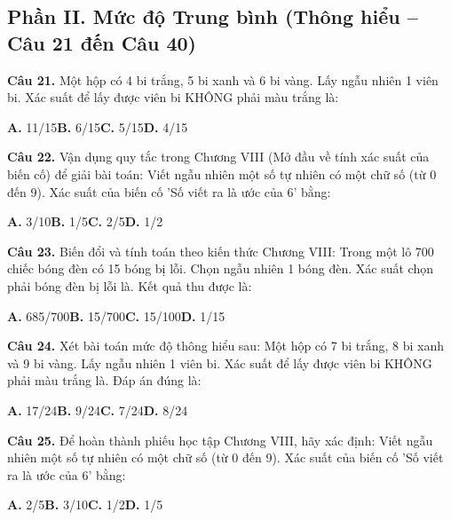 \documentclass[11pt,a4paper]{article}
\begin{document}
\subsection*{\color{accent} Phần II. Mức độ Trung bình (Thông hiểu -- Câu 21 đến Câu 40)}
\textbf{\color{primary} Câu 21.} Một hộp có 4 bi trắng, 5 bi xanh và 6 bi vàng. Lấy ngẫu nhiên 1 viên bi. Xác suất để lấy được viên bi KHÔNG phải màu trắng là:\par
\hspace*{1.5em}\textbf{A.} 11/15\quad\quad \textbf{B.} 6/15\quad\quad \textbf{C.} 5/15\quad\quad \textbf{D.} 4/15\par\vspace{2pt}
\textbf{\color{primary} Câu 22.} Vận dụng quy tắc trong Chương VIII (Mở đầu về tính xác suất của biến cố) để giải bài toán: Viết ngẫu nhiên một số tự nhiên có một chữ số (từ 0 đến 9). Xác suất của biến cố 'Số viết ra là ước của 6' bằng:\par
\hspace*{1.5em}\textbf{A.} 3/10\quad\quad \textbf{B.} 1/5\quad\quad \textbf{C.} 2/5\quad\quad \textbf{D.} 1/2\par\vspace{2pt}
\textbf{\color{primary} Câu 23.} Biến đổi và tính toán theo kiến thức Chương VIII: Trong một lô 700 chiếc bóng đèn có 15 bóng bị lỗi. Chọn ngẫu nhiên 1 bóng đèn. Xác suất chọn phải bóng đèn bị lỗi là. Kết quả thu được là:\par
\hspace*{1.5em}\textbf{A.} 685/700\quad\quad \textbf{B.} 15/700\quad\quad \textbf{C.} 15/100\quad\quad \textbf{D.} 1/15\par\vspace{2pt}
\textbf{\color{primary} Câu 24.} Xét bài toán mức độ thông hiểu sau: Một hộp có 7 bi trắng, 8 bi xanh và 9 bi vàng. Lấy ngẫu nhiên 1 viên bi. Xác suất để lấy được viên bi KHÔNG phải màu trắng là. Đáp án đúng là:\par
\hspace*{1.5em}\textbf{A.} 17/24\quad\quad \textbf{B.} 9/24\quad\quad \textbf{C.} 7/24\quad\quad \textbf{D.} 8/24\par\vspace{2pt}
\textbf{\color{primary} Câu 25.} Để hoàn thành phiếu học tập Chương VIII, hãy xác định: Viết ngẫu nhiên một số tự nhiên có một chữ số (từ 0 đến 9). Xác suất của biến cố 'Số viết ra là ước của 6' bằng:\par
\hspace*{1.5em}\textbf{A.} 2/5\quad\quad \textbf{B.} 3/10\quad\quad \textbf{C.} 1/2\quad\quad \textbf{D.} 1/5\par\vspace{2pt}
\end{document}
